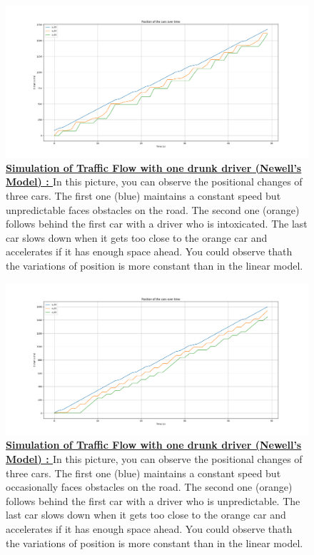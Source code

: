 \documentclass{article}
\begin{document}
			\begin{figure}[H]
			\centering
			\includegraphics[width=\textwidth]{Model1W3C_O_Aco_I2_Linear.png}
			\caption[Simulation of Traffic Flow with one drunk driver (Newell's Model).]{\textbf{\underline{Simulation of Traffic Flow with one drunk driver (Newell's Model) : }} In this picture, you can observe the positional changes of three cars. The first one (blue) maintains a constant speed but unpredictable faces obstacles on the road. The second one (orange) follows behind the first car with a driver who is intoxicated. The last car slows down when it gets too close to the orange car and accelerates if it has enough space ahead. You could observe thath the variations of position is more constant than in the linear model.}
			\label{fig:Model1W3C_O_Aco_I2_Linear}
		\end{figure}
		
			\begin{figure}[H]
			\centering
			\includegraphics[width=\textwidth]{Model1W3C_O_Aco_I2_Newell.png}
			\caption[Simulation of Traffic Flow with one drunk driver (Newell's Model).]{\textbf{\underline{Simulation of Traffic Flow with one drunk driver (Newell's Model) : }} In this picture, you can observe the positional changes of three cars. The first one (blue) maintains a constant speed but occasionally faces obstacles on the road. The second one (orange) follows behind the first car with a driver who is unpredictable. The last car slows down when it gets too close to the orange car and accelerates if it has enough space ahead. You could observe thath the variations of position is more constant than in the linear model.}
			\label{fig:Model1W3C_O_Aco_I2_Newell}
		\end{figure}
	
\end{document}
